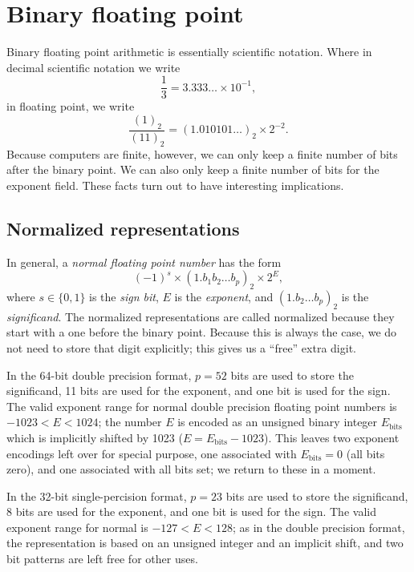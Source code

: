 \documentclass[12pt, leqno]{article} %
\begin{document}

\section{Binary floating point}

Binary floating point arithmetic is essentially scientific notation.
Where in decimal scientific notation we write
\[
  \frac{1}{3}
  = 3.333\ldots \times 10^{-1},
\]
in floating point, we write
\[
  \frac{(1)_2}{(11)_2}
  = (1.010101\ldots)_2 \times 2^{-2}.
\]
Because computers are finite, however, we can only keep a finite
number of bits after the binary point.  We can also only keep a finite
number of bits for the exponent field.  These facts turn out to have
interesting implications.

\subsection{Normalized representations}

In general, a {\em normal floating point number} has the form
\[
  (-1)^s \times (1.b_1 b_2 \ldots b_p)_2 \times 2^{E},
\]
where $s \in \{0,1\}$ is the {\em sign bit},
$E$ is the {\em exponent}, and
$(1.b_2 \ldots b_p)_2$ is the {\em significand}.
The normalized representations are called normalized because they
start with a one before the binary point.  Because this is always
the case, we do not need to store that digit explicitly; this gives
us a ``free'' extra digit.

In the 64-bit double precision format, $p = 52$ bits are used to store
the significand, 11 bits are used for the exponent, and one bit is
used for the sign.  The valid exponent range for normal double
precision floating point numbers is $-1023 < E < 1024$; the number
$E$ is encoded as an unsigned binary integer $E_{\mathrm{bits}}$
which is implicitly shifted by 1023 ($E = E_{\mathrm{bits}}-1023$).
This leaves two exponent encodings left over for special purpose,
one associated with $E_{\mathrm{bits}} = 0$ (all bits zero),
and one associated with all bits set; we return to these in a moment.

In the 32-bit single-percision format, $p = 23$ bits are used to store
the significand, 8 bits are used for the exponent, and one bit is used
for the sign.  The valid exponent range for normal is $-127 < E < 128$;
as in the double precision format, the representation is based on an
unsigned integer and an implicit shift, and two bit patterns are left
free for other uses.
\end{document}

